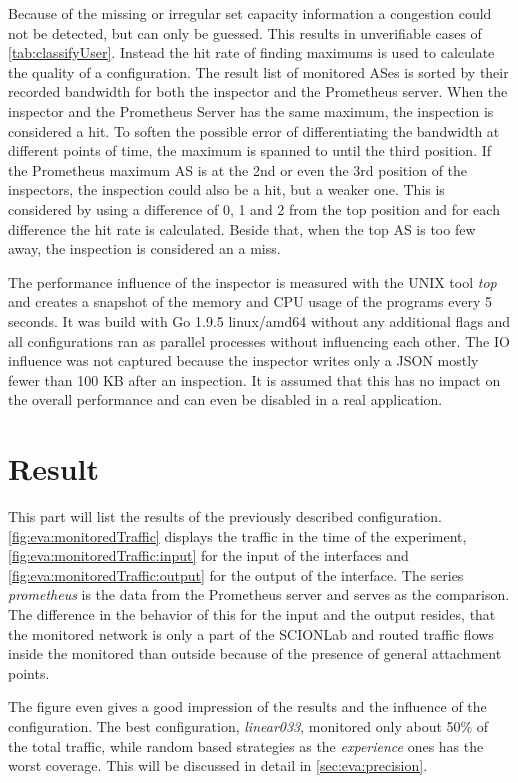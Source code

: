 \documentclass[thesis.tex]{subfiles}
\begin{document}
Because of the missing or irregular set capacity information a congestion could not be detected, but can only be guessed. This results in unverifiable cases of \autoref{tab:classifyUser}. Instead the hit rate of finding maximums is used to calculate the quality of a configuration. The result list of monitored ASes is sorted by their recorded bandwidth for both the inspector and the Prometheus server. When the inspector and the Prometheus Server has the same maximum, the inspection is considered a hit. To soften the possible error of differentiating the bandwidth at different points of time, the maximum is spanned to until the third position. If the Prometheus maximum AS is at the 2nd or even the 3rd position of the inspectors, the inspection could also be a hit, but a weaker one. This is considered by using a difference of 0, 1 and 2 from the top position and for each difference the hit rate is calculated. Beside that, when the top AS is too few away, the inspection is considered an a miss.

The performance influence of the inspector is measured with the UNIX tool \textit{top} and creates a snapshot of the memory and CPU usage of the programs every 5 seconds. It was build with Go 1.9.5 linux/amd64 without any additional flags and all configurations ran as parallel processes without influencing each other. The IO influence was not captured because the inspector writes only a JSON mostly fewer than 100 KB after an inspection. It is assumed that this has no impact on the overall performance and can even be disabled in a real application.

\section{Result}
This part will list the results of the previously described configuration. \autoref{fig:eva:monitoredTraffic} displays the traffic in the time of the experiment, \autoref{fig:eva:monitoredTraffic:input} for the input of the interfaces and \autoref{fig:eva:monitoredTraffic:output} for the output of the interface. The series \textit{prometheus} is the data from the Prometheus server and serves as the comparison. The difference in the behavior of this for the input and the output resides, that the monitored network is only a part of the SCIONLab and routed traffic flows inside the monitored than outside because of the presence of general attachment points. 

The figure even gives a good impression of the results and the influence of the configuration. The best configuration, \textit{linear033}, monitored only about 50\% of the total traffic, while random based strategies as the \textit{experience} ones has the worst coverage. This will be discussed in detail in \autoref{sec:eva:precision}.
\end{document}
